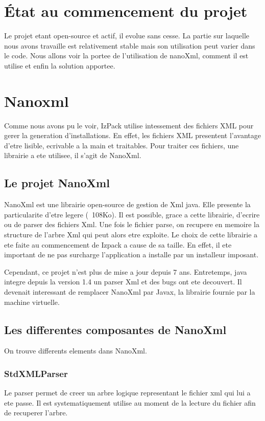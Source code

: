 \section{État au commencement du projet}
Le projet etant open-source et actif, il evolue sans cesse. La partie sur laquelle nous avons travaille est relativement stable mais son utilisation peut varier dans le code. Nous allons voir la portee de l'utilisation de nanoXml, comment il est utilise et enfin la solution apportee.

\section{Nanoxml}
Comme nous avons pu le voir, IzPack utilise intessement des fichiers XML pour gerer la generation d'installations. En effet, les fichiers XML presentent l'avantage d'etre lisible, ecrivable a la main et traitables. Pour traiter ces fichiers, une librairie a ete utilisee, il s'agit de NanoXml.
\subsection{Le projet NanoXml}
NanoXml est une librairie open-source de gestion de Xml java. Elle presente la particularite d'etre legere (~108Ko). Il est possible, grace a cette librairie, d'ecrire ou de parser des fichiers Xml. Une fois le fichier parse, on recupere en memoire la structure de l'arbre Xml qui peut alors etre exploite. Le choix de cette librairie a ete faite au commencement de Izpack a cause de sa taille. En effet, il ete important de ne pas surcharge l'application a installe par un installeur imposant. 

Cependant, ce projet n'est plus de mise a jour depuis 7 ans. Entretemps, java integre depuis la version 1.4 un parser Xml et des bugs ont ete decouvert. Il devenait interessant de remplacer NanoXml par Javax, la librairie fournie par la machine virtuelle.
\subsection{Les differentes composantes de NanoXml}
On trouve differents elements dans NanoXml.
\subsubsection{StdXMLParser}
Le parser permet de creer un arbre logique representant le fichier xml qui lui a ete passe. Il est systematiquement utilise au moment de la lecture du fichier afin de recuperer l'arbre.

